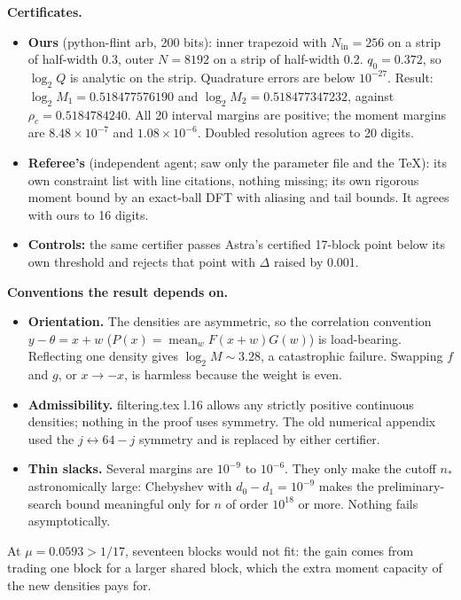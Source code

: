 \documentclass[11pt]{article}
\DeclareMathOperator{\mean}{mean}
\theoremstyle{plain}
\begin{document}
\textbf{Certificates.}

\begin{itemize}
\item \textbf{Ours} (python-flint arb, 200 bits): inner trapezoid with $N_{\mathrm{in}} = 256$ on a strip of half-width 0.3, outer $N = 8192$ on a strip of half-width 0.2. $q_0 = 0.372$, so $\log_2 Q$ is analytic on the strip. Quadrature errors are below $10^{-27}$. Result: $\log_2 M_1 = 0.518477576190$ and $\log_2 M_2 = 0.518477347232$, against $\rho_c = 0.5184784240$. All 20 interval margins are positive; the moment margins are $8.48\times10^{-7}$ and $1.08\times10^{-6}$. Doubled resolution agrees to 20 digits.
\item \textbf{Referee's} (independent agent; saw only the parameter file and the TeX): its own constraint list with line citations, nothing missing; its own rigorous moment bound by an exact-ball DFT with aliasing and tail bounds. It agrees with ours to 16 digits.
\item \textbf{Controls:} the same certifier passes Astra's certified 17-block point below its own threshold and rejects that point with $\Delta$ raised by 0.001.
\end{itemize}

\textbf{Conventions the result depends on.}

\begin{itemize}
\item \textbf{Orientation.} The densities are asymmetric, so the correlation convention $y - \theta = x + w$ ($P(x) = \mean_w F(x+w)G(w)$) is load-bearing. Reflecting one density gives $\log_2 M \sim 3.28$, a catastrophic failure. Swapping $f$ and $g$, or $x \to -x$, is harmless because the weight is even.
\item \textbf{Admissibility.} filtering.tex l.16 allows any strictly positive continuous densities; nothing in the proof uses symmetry. The old numerical appendix used the $j \leftrightarrow 64-j$ symmetry and is replaced by either certifier.
\item \textbf{Thin slacks.} Several margins are $10^{-9}$ to $10^{-6}$. They only make the cutoff $n_*$ astronomically large: Chebyshev with $d_0 - d_1 = 10^{-9}$ makes the preliminary-search bound meaningful only for $n$ of order $10^{18}$ or more. Nothing fails asymptotically.
\end{itemize}

At $\mu = 0.0593 > 1/17$, seventeen blocks would not fit: the gain comes from trading one block for a larger shared block, which the extra moment capacity of the new densities pays for.
\end{document}
